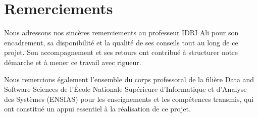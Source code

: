 \chapter*{Remerciements}

Nous adressons nos sincères remerciements au professeur IDRI Ali pour son encadrement, sa disponibilité et la qualité de ses conseils tout au long de ce projet. Son accompagnement et ses retours ont contribué à structurer notre démarche et à mener ce travail avec rigueur.

Nous remercions également l'ensemble du corps professoral de la filière Data and Software Sciences de l'École Nationale Supérieure d'Informatique et d'Analyse des Systèmes (ENSIAS) pour les enseignements et les compétences transmis, qui ont constitué un appui essentiel à la réalisation de ce projet.
